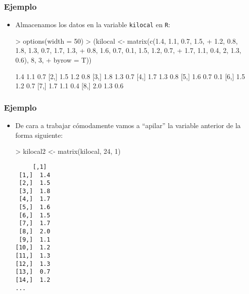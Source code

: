 \begin{frame}[fragile]
\frametitle{Ejemplo}
\begin{itemize}
\item<2-> Almacenamos los datos en la variable {\tt kilocal} en {\tt R}:

\begin{Schunk}
\begin{Sinput}
> options(width = 50)
> (kilocal <- matrix(c(1.4, 1.1, 0.7, 1.5, 
+     1.2, 0.8, 1.8, 1.3, 0.7, 1.7, 1.3, 
+     0.8, 1.6, 0.7, 0.1, 1.5, 1.2, 0.7, 
+     1.7, 1.1, 0.4, 2, 1.3, 0.6), 8, 3, 
+     byrow = T))
\end{Sinput}
\begin{Soutput}
     [,1] [,2] [,3]
[1,]  1.4  1.1  0.7
[2,]  1.5  1.2  0.8
[3,]  1.8  1.3  0.7
[4,]  1.7  1.3  0.8
[5,]  1.6  0.7  0.1
[6,]  1.5  1.2  0.7
[7,]  1.7  1.1  0.4
[8,]  2.0  1.3  0.6
\end{Soutput}
\end{Schunk}

\end{itemize}
\end{frame}
\begin{frame}[fragile]
\frametitle{Ejemplo}
\begin{itemize}
\item<2-> De cara a trabajar cómodamente vamos a ``apilar'' la variable anterior de la forma siguiente:

{\small 
\begin{Schunk}
\begin{Sinput}
> kilocal2 <- matrix(kilocal, 24, 1)
\end{Sinput}
\end{Schunk}

\begin{verbatim}
     [,1]
 [1,]  1.4
 [2,]  1.5
 [3,]  1.8
 [4,]  1.7
 [5,]  1.6
 [6,]  1.5
 [7,]  1.7
 [8,]  2.0
 [9,]  1.1
[10,]  1.2
[11,]  1.3
[12,]  1.3
[13,]  0.7
[14,]  1.2
...
\end{verbatim}}
\end{itemize}
\end{frame}
